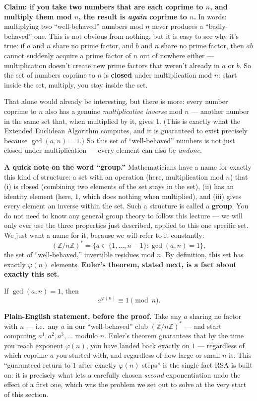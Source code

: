 \textbf{Claim: if you take two numbers that are each coprime to $n$, and multiply them mod $n$, the result is \emph{again} coprime to $n$.} In words: multiplying two ``well-behaved'' numbers mod $n$ never produces a ``badly-behaved'' one. This is not obvious from nothing, but it is easy to see why it's true: if $a$ and $n$ share no prime factor, and $b$ and $n$ share no prime factor, then $ab$ cannot suddenly acquire a prime factor of $n$ out of nowhere either — multiplication doesn't create new prime factors that weren't already in $a$ or $b$. So the set of numbers coprime to $n$ is \textbf{closed} under multiplication mod $n$: start inside the set, multiply, you stay inside the set.

That alone would already be interesting, but there is more: every number coprime to $n$ also has a genuine \emph{multiplicative inverse} mod $n$ — another number in the same set that, when multiplied by it, gives $1$. (This is exactly what the Extended Euclidean Algorithm computes, and it is guaranteed to exist precisely because $\gcd(a,n)=1$.) So this set of ``well-behaved'' numbers is not just closed under multiplication — every element can also be \emph{undone}.

\medskip\noindent\textbf{A quick note on the word ``group.''} Mathematicians have a name for exactly this kind of structure: a set with an operation (here, multiplication mod $n$) that (i) is closed (combining two elements of the set stays in the set), (ii) has an identity element (here, $1$, which does nothing when multiplied), and (iii) gives every element an inverse within the set. Such a structure is called a \textbf{group}. You do not need to know any general group theory to follow this lecture — we will only ever use the three properties just described, applied to this one specific set. We just want a name for it, because we will refer to it constantly:
\[
(\mathbb{Z}/n\mathbb{Z})^{*} = \{a \in \{1,\dots,n-1\} : \gcd(a,n)=1\},
\]
the set of ``well-behaved,'' invertible residues mod $n$. By definition, this set has exactly $\varphi(n)$ elements. \textbf{Euler's theorem, stated next, is a fact about exactly this set.}

\begin{theorem}\label{thm:euler}
If $\gcd(a, n) = 1$, then
\[
a^{\varphi(n)} \equiv 1 \pmod{n}.
\]
\end{theorem}

\medskip\noindent\textbf{Plain-English statement, before the proof.} Take any $a$ sharing no factor with $n$ — i.e.\ any $a$ in our ``well-behaved'' club $(\mathbb{Z}/n\mathbb{Z})^{*}$ — and start computing $a^1, a^2, a^3,\dots$ modulo $n$. Euler's theorem guarantees that by the time you reach exponent $\varphi(n)$, you have landed back exactly on $1$ — regardless of which coprime $a$ you started with, and regardless of how large or small $n$ is. This ``guaranteed return to $1$ after exactly $\varphi(n)$ steps'' is the single fact RSA is built on: it is precisely what lets a carefully chosen \emph{second} exponentiation undo the effect of a first one, which was the problem we set out to solve at the very start of this section.

